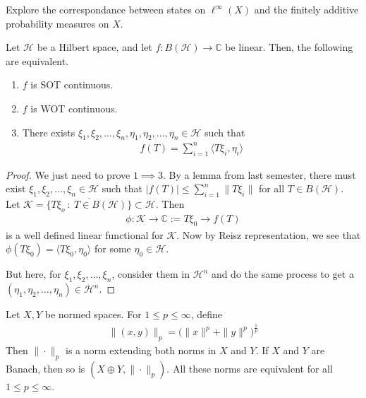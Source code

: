 

\begin{exercise}
  Explore the correspondance between states on $\ell^{\infty}(X)$ and
  the finitely additive probability measures on $X$.
\end{exercise}

\begin{theorem}
  Let $\mathcal{H}$ be a Hilbert space, and let $f: B(\mathcal{H})
  \to \mathbb{C}$ be linear. Then, the following are equivalent.
  \begin{enumerate}[label=(\arabic*)]
    \item $f$ is SOT continuous.
    \item $f$ is WOT continuous.
    \item There exists $\xi_1 , \xi_2 , \ldots , \xi_n, \eta_1 ,
      \eta_2 , \ldots , \eta_n \in \mathcal{H}$ such that
      \begin{align*}
        f(T) = \sum_{i = 1}^{n} \langle T \xi_i , \eta_i \rangle
      \end{align*}
  \end{enumerate}
\end{theorem}
\begin{proof}
  We just need to prove $1 \implies 3$. By a lemma from last semester,
  there must exist $ \xi_1 , \xi_2 , \ldots , \xi_n \in \mathcal{H}$
  such that $|f(T)| \le \sum_{i = 1}^{n}  \|T \xi_i\|$ for all $T \in
  B(\mathcal{H})$. Let $   \mathcal{K} = \overline{\{ T \xi_o  \ : \
  T \in B(\mathcal{H}) \}} \subset \mathcal{H}$. Then
  \begin{align*}
    \phi: \mathcal{K} \to \mathbb{C} := T \xi_0 \to f(T)
  \end{align*}
  is a well defined linear functional for $\mathcal{K}$. Now by Reisz
  representation, we see that $\phi(T \xi_0) = \langle  T \xi_0 ,
  \eta_0 \rangle $ for some $\eta_0 \in \mathcal{H}$.

  But here, for $\xi_1 , \xi_2 , \ldots, \xi_n$, consider them in
  $\mathcal{H}^n$ and do the same process to get a $(\eta_1 , \eta_2
  , \ldots , \eta_n) \in \mathcal{H}^n$.
\end{proof}

\begin{theorem}
  Let $X, Y$ be normed spaces. For $1 \le p \le \infty$, define
  \begin{align*}
    \|(x, y)\|_p = \Big( \|x\|^p + \|y\|^p\Big)^{\frac{1}{p}}
  \end{align*}
  Then $\|\cdot\|_p$ is a norm extending both norms in $X$ and $Y$.
  If $X$ and $Y$ are Banach, then so is $(X \oplus Y, \|\cdot\|_p)$.
  All these norms are equivalent for all $1 \le p \le \infty$.
\end{theorem}

